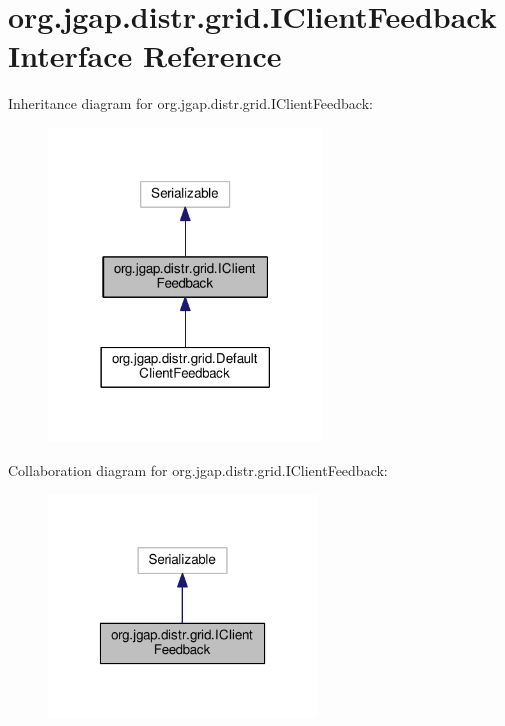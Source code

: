 \hypertarget{interfaceorg_1_1jgap_1_1distr_1_1grid_1_1_i_client_feedback}{\section{org.\-jgap.\-distr.\-grid.\-I\-Client\-Feedback Interface Reference}
\label{interfaceorg_1_1jgap_1_1distr_1_1grid_1_1_i_client_feedback}
}


Inheritance diagram for org.\-jgap.\-distr.\-grid.\-I\-Client\-Feedback\-:
\nopagebreak
\begin{figure}[H]
\begin{center}
\leavevmode
\includegraphics[width=206pt]{interfaceorg_1_1jgap_1_1distr_1_1grid_1_1_i_client_feedback__inherit__graph}
\end{center}
\end{figure}


Collaboration diagram for org.\-jgap.\-distr.\-grid.\-I\-Client\-Feedback\-:
\nopagebreak
\begin{figure}[H]
\begin{center}
\leavevmode
\includegraphics[width=202pt]{interfaceorg_1_1jgap_1_1distr_1_1grid_1_1_i_client_feedback__coll__graph}
\end{center}
\end{figure}
